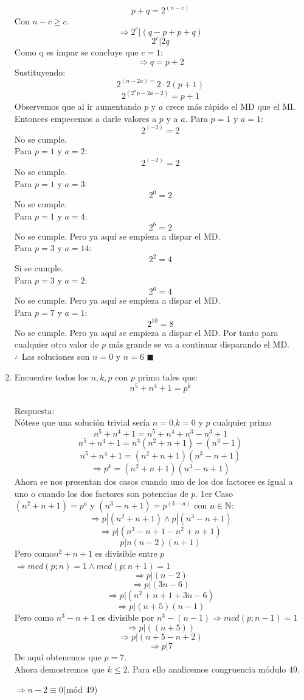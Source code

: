 \documentclass{book}
\begin{document}
\begin{enumerate}
$$p+q=2^{(n-c)}$$
Con $n-c\geq c$.
$$\Rightarrow 2^c|(q-p+p+q)$$
$$2^c|2q$$
Como q es impar se concluye que $c=1$:
$$\Rightarrow q=p+2$$
Sustituyendo:
$$2^{(n-2a)=}2\cdot 2(p+1)$$
$$2^{(2^a p-2a-2)}=p+1$$
Observemos que al ir aumentando $p$ y $a$ crece más rápido el MD que el MI. Entonces empecemos a darle valores a $p$ y a $a$.
Para $p=1$ y $a=1$:
$$2^{(-2)}=2$$
No se cumple.\\
Para $p=1$ y $a=2$:
$$2^{(-2)}=2$$
No se cumple.\\
Para $p=1$ y $a=3$:
$$2^0=2$$
No se cumple.\\
Para $p=1$ y $a=4$:
$$2^6=2$$
No se cumple. Pero ya aquí se empieza a dispar el MD.\\
Para $p=3$ y $a=14$:
$$2^2=4$$
Si se cumple.\\
Para $p=3$ y $a=2$:
$$2^6=4$$
No se cumple. Pero ya aquí se empieza a dispar el MD.\\
Para $p=7$ y $a=1$:
$$2^{10}=8$$
No se cumple. Pero ya aquí se empieza a dispar el MD. Por tanto para cualquier otro valor de $p$ más grande se va a continuar disparando el MD.\\
$\therefore$ Las soluciones son $n=0$ y $n=6$ $\blacksquare$\\
			\item Encuentre todos los $n,k,p$ con $p$ primo tales que:
			$$n^5+n^4+1=p^k$$\\
			Respuesta:\\
			Nótese que una solución trivial sería $ n=0$,$k=0$  y  $p$ cualquier primo
$$n^5+n^4+1=n^5+n^4+n^3-n^3+1$$
$$n^5+n^4+1=n^3 (n^2+n+1)-(n^3-1)$$
$$n^5+n^4+1=(n^2+n+1)(n^3-n+1)$$
$$\Rightarrow p^k=(n^2+n+1)(n^3-n+1)$$
Ahora se nos presentan dos casos cuando uno de los dos factores es igual a uno o cuando los dos factores son potencias de $p$.
1er Caso
$(n^2+n+1)=p^a$ y $(n^3-n+1)=p^{(k-a)}$ con $a\in\mathbb{N}$:
$$\Rightarrow p|(n^2+n+1)  \wedge  p|(n^3-n+1)$$
$$\Rightarrow p|(n^3-n+1-n^2+n+1)$$
$$p|n(n-2)(n+1)$$ 
Pero como$ n^2+n+1$ es divisible entre $p$ $\Rightarrow mcd(p;n)=1\wedge mcd(p;n+1)=1$
$$\Rightarrow p|(n-2)$$
$$\Rightarrow p|(3n-6)$$
$$\Rightarrow p|(n^2+n+1+3n-6)$$
$$\Rightarrow p|(n+5)(n-1)$$ 
Pero como $n^3-n+1$ es divisible por $n^3-(n-1)\Rightarrow mcd(p;n-1)=1$
$$\Rightarrow p|((n+5) )$$
$$\Rightarrow p|(n+5-n+2)$$
$$\Rightarrow p|7$$
De aquí obtenemos que $p=7$.\\
Ahora demostremos que $k\leq 2$. Para ello analicemos congruencia módulo 49. 
			\begin{center}
				$\Rightarrow n-2\equiv 0$(mód 49)\\

\end{center}
\end{enumerate}
\end{document}
